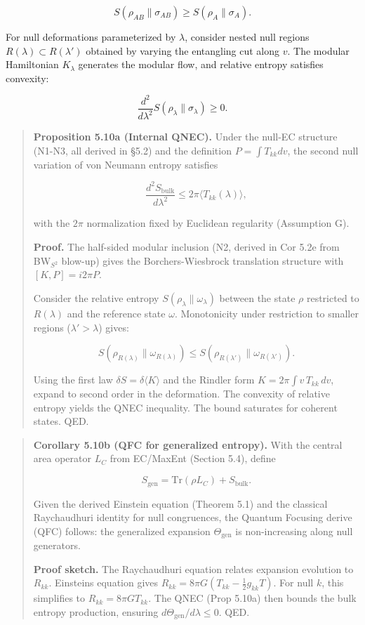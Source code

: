 \[
S(\rho_{AB} \| \sigma_{AB}) \ge S(\rho_A \| \sigma_A).
\]

For null deformations parameterized by \(\lambda\), consider nested null regions \(R(\lambda) \subset R(\lambda')\) obtained by varying the entangling cut along \(v\). The modular Hamiltonian \(K_\lambda\) generates the modular flow, and relative entropy satisfies convexity:

\[
\frac{d^2}{d\lambda^2} S(\rho_\lambda \| \sigma_\lambda) \ge 0.
\]

\begin{quote}
\textbf{Proposition 5.10a (Internal QNEC).} Under the null-EC structure (N1-N3, all derived in §5.2) and the definition \(P = \int T_{kk} dv\), the second null variation of von Neumann entropy satisfies

\[
\frac{d^2 S_{\mathrm{bulk}}}{d\lambda^2} \le 2\pi \langle T_{kk}(\lambda) \rangle,
\]

with the \(2\pi\) normalization fixed by Euclidean regularity (Assumption G).

\textbf{Proof.} The half-sided modular inclusion (N2, derived in Cor 5.2e from BW\(_{S^2}\) blow-up) gives the Borchers-Wiesbrock translation structure with \([K, P] = i 2\pi P\).

Consider the relative entropy \(S(\rho_\lambda \| \omega_\lambda)\) between the state \(\rho\) restricted to \(R(\lambda)\) and the reference state \(\omega\). Monotonicity under restriction to smaller regions (\(\lambda' > \lambda\)) gives:

\[
S(\rho_{R(\lambda)} \| \omega_{R(\lambda)}) \le S(\rho_{R(\lambda')} \| \omega_{R(\lambda')}).
\]

Using the first law \(\delta S = \delta \langle K \rangle\) and the Rindler form \(K = 2\pi \int v \, T_{kk} \, dv\), expand to second order in the deformation. The convexity of relative entropy yields the QNEC inequality. The bound saturates for coherent states. QED.
\end{quote}

\begin{quote}
\textbf{Corollary 5.10b (QFC for generalized entropy).} With the central area operator \(L_C\) from EC/MaxEnt (Section 5.4), define

\[
S_{\mathrm{gen}} = \mathrm{Tr}(\rho L_C) + S_{\mathrm{bulk}}.
\]

Given the derived Einstein equation (Theorem 5.1) and the classical Raychaudhuri identity for null congruences, the Quantum Focusing derive (QFC) follows: the generalized expansion \(\Theta_{\mathrm{gen}}\) is non-increasing along null generators.

\textbf{Proof sketch.} The Raychaudhuri equation relates expansion evolution to \(R_{kk}\). Einstein\textquotesingle s equation gives \(R_{kk} = 8\pi G (T_{kk} - \frac{1}{2}g_{kk}T)\). For null \(k\), this simplifies to \(R_{kk} = 8\pi G T_{kk}\). The QNEC (Prop 5.10a) then bounds the bulk entropy production, ensuring \(d\Theta_{\mathrm{gen}}/d\lambda \le 0\). QED.
\end{quote}

